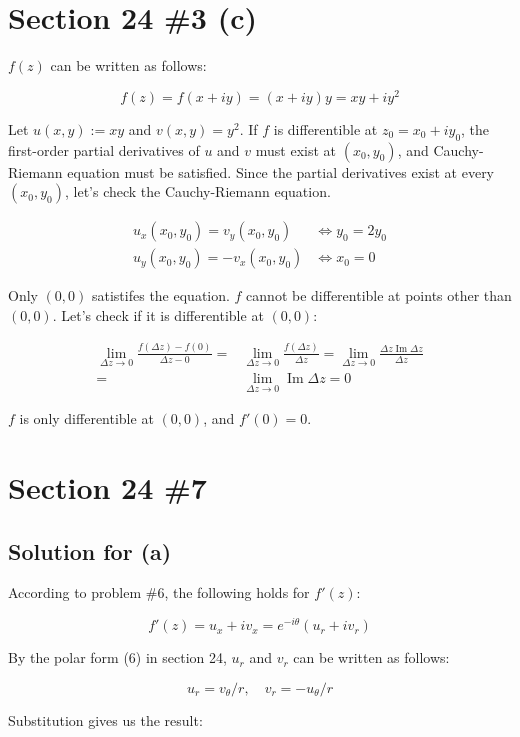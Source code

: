 \documentclass{scrartcl}
\begin{document}
\section{Section 24 \#3 (c)}
\(f(z)\) can be written as follows:

\[
  f(z) = f(x + iy) = (x + iy)y = xy + iy^2
\]

Let \(u(x, y) := xy\) and \(v(x, y) = y^2\).
If \(f\) is differentible at \(z_0 = x_0 + iy_0\), the first-order partial derivatives of \(u\) and \(v\) must exist at \((x_0, y_0)\), and Cauchy-Riemann equation must be satisfied.
Since the partial derivatives exist at every \((x_0, y_0)\), let's check the Cauchy-Riemann equation.

\begin{align*}
  u_x(x_0, y_0) = v_y(x_0, y_0) &\Longleftrightarrow y_0 = 2y_0 \\
  u_y(x_0, y_0) = -v_x(x_0, y_0) &\Longleftrightarrow x_0 = 0
\end{align*}

Only \((0, 0)\) satistifes the equation.
\(f\) cannot be differentible at points other than \((0, 0)\).
Let's check if it is differentible at \((0, 0)\):

\begin{align*}
  \lim_{\Delta z \to 0} \frac{f(\Delta z) - f(0)}{\Delta z - 0} =& \lim_{\Delta z \to 0} \frac{f(\Delta z)}{\Delta z} = \lim_{\Delta z \to 0} \frac{\Delta z \operatorname{Im} \Delta z}{\Delta z} \\
  =& \lim_{\Delta z \to 0} \operatorname{Im} \Delta z = 0
\end{align*}

\(f\) is only differentible at \((0, 0)\), and \(f'(0) = 0\).

\section{Section 24 \#7}
\subsection{Solution for (a)}
According to problem \#6, the following holds for \(f'(z)\):

\[
  f'(z) = u_x + iv_x = e^{-i\theta} (u_r + iv_r)
\]

By the polar form (6) in section 24, \(u_r\) and \(v_r\) can be written as follows:

\[
  u_r = v_\theta / r, \quad v_r = -u_\theta / r
\]

Substitution gives us the result:
\end{document}
